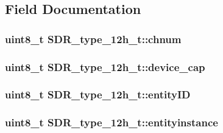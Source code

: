 \subsection{Field Documentation}
\hypertarget{structSDR__type__12h__t_a7fca01e056eda23e5fafdbfc1901d3a9}{
\subsubsection[{chnum}]{\setlength{\rightskip}{0pt plus 5cm}uint8\-\_\-t S\-D\-R\-\_\-type\-\_\-12h\-\_\-t\-::chnum}}\label{structSDR__type__12h__t_a7fca01e056eda23e5fafdbfc1901d3a9}
\hypertarget{structSDR__type__12h__t_a5d4e3447daf56f07fe77c21809d4c3ae}{
\subsubsection[{device\-\_\-cap}]{\setlength{\rightskip}{0pt plus 5cm}uint8\-\_\-t S\-D\-R\-\_\-type\-\_\-12h\-\_\-t\-::device\-\_\-cap}}\label{structSDR__type__12h__t_a5d4e3447daf56f07fe77c21809d4c3ae}
\hypertarget{structSDR__type__12h__t_a0668c976ae141ed567fd1eb3baefa4ce}{
\subsubsection[{entity\-I\-D}]{\setlength{\rightskip}{0pt plus 5cm}uint8\-\_\-t S\-D\-R\-\_\-type\-\_\-12h\-\_\-t\-::entity\-I\-D}}\label{structSDR__type__12h__t_a0668c976ae141ed567fd1eb3baefa4ce}
\hypertarget{structSDR__type__12h__t_ac4ee61cf6d225f5e48eff587c107a93a}{
\subsubsection[{entityinstance}]{\setlength{\rightskip}{0pt plus 5cm}uint8\-\_\-t S\-D\-R\-\_\-type\-\_\-12h\-\_\-t\-::entityinstance}}\label{structSDR__type__12h__t_ac4ee61cf6d225f5e48eff587c107a93a}
